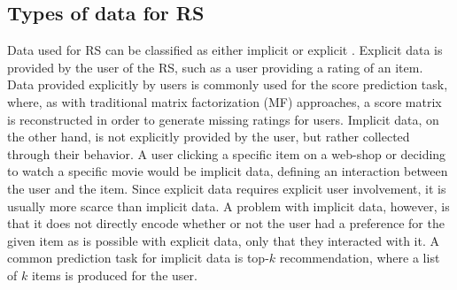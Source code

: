 \subsection{Types of data for RS}
Data used for RS can be classified as either implicit or explicit \cite{oard1998implicit}.
Explicit data is provided by the user of the RS, such as a user providing a rating of an item.
Data provided explicitly by users is commonly used for the score prediction task, where, as with traditional matrix factorization (MF) approaches, a score matrix is reconstructed in order to generate missing ratings for users.
Implicit data, on the other hand, is not explicitly provided by the user, but rather collected through their behavior.
A user clicking a specific item on a web-shop or deciding to watch a specific movie would be implicit data, defining an interaction between the user and the item.
Since explicit data requires explicit user involvement, it is usually more scarce than implicit data.
A problem with implicit data, however, is that it does not directly encode whether or not the user had a preference for the given item as is possible with explicit data, only that they interacted with it.
A common prediction task for implicit data is top-$k$ recommendation, where a list of $k$ items is produced for the user.


